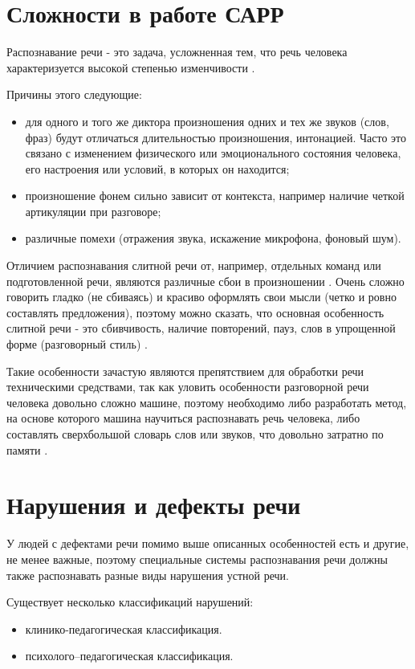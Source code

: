 \section{Сложности в работе САРР}
Распознавание речи - это задача, усложненная тем, что речь человека характеризуется высокой степенью изменчивости \cite{spr}. 

Причины этого следующие:
\begin{itemize}
	\item для одного и того же диктора произношения одних и тех же звуков (слов, фраз) будут отличаться длительностью произношения, интонацией. Часто это связано с изменением физического или эмоционального состояния человека, его настроения или условий, в которых он находится;
	\item произношение фонем сильно зависит от контекста, например наличие четкой артикуляции при разговоре;
	\item различные помехи (отражения звука, искажение микрофона, фоновый шум).
\end{itemize}

Отличием распознавания слитной речи от, например, отдельных команд или подготовленной речи, являются различные сбои в произношении \cite{rechsb2} \cite{rechsb1}. Очень сложно говорить гладко (не сбиваясь) и красиво оформлять свои мысли (четко и ровно составлять предложения), поэтому можно сказать, что основная особенность слитной речи - это сбивчивость, наличие повторений, пауз, слов в упрощенной форме (разговорный стиль) \cite{slitrech}. 

Такие особенности зачастую являются препятствием для обработки речи техническими средствами, так как уловить особенности разговорной речи человека довольно сложно машине, поэтому необходимо либо разработать метод, на основе которого машина научиться распознавать речь человека, либо составлять сверхбольшой словарь слов или звуков, что довольно затратно по памяти \cite{slitrech}.


\section{Нарушения и дефекты речи}
У людей с дефектами речи помимо выше описанных особенностей есть и другие, не менее важные, поэтому специальные системы распознавания речи должны также распознавать разные виды нарушения устной речи.

Существует несколько классификаций нарушений:
\begin{itemize}
	\item клинико-педагогическая классификация.
	\item психолого–педагогическая классификация.
\end{itemize}

